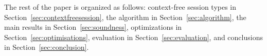 
The rest of the paper is organized as follows: context-free session
types in Section~\ref{sec:contextfreesession}, the algorithm in
Section~\ref{sec:algorithm}, the main results in
Section~\ref{sec:soundness}, optimizations in
Section~\ref{sec:optimisations}, evaluation in
Section~\ref{sec:evaluation}, and conclusions in
Section~\ref{sec:conclusion}.



